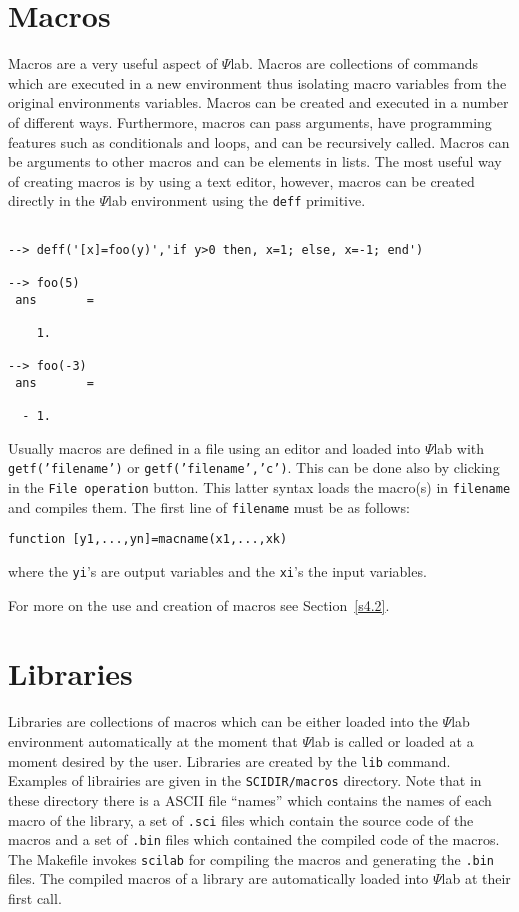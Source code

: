 \section{Macros}
\label{s2.6}

	Macros are a very useful aspect of $\Psi$lab.  Macros
are collections of commands which are executed in a
new environment thus isolating macro variables from the original
environments variables.  Macros
can be created and executed in a number of different ways.
Furthermore, macros can pass arguments, have programming features
such as conditionals and loops, and can be recursively called.
Macros can be arguments
to other macros and can be elements in lists.  The most useful
way of creating macros is by using a text editor, however, macros
can be created directly in the $\Psi$lab environment using the 
{\tt deff} primitive.
\begin{verbatim}
 
--> deff('[x]=foo(y)','if y>0 then, x=1; else, x=-1; end')
 
--> foo(5)
 ans       =
 
    1.  
 
--> foo(-3)
 ans       =
 
  - 1.  
\end{verbatim}
Usually macros are defined in a file using an editor and loaded
into $\Psi$lab with {\tt getf('filename')} or {\tt getf('filename','c')}.
This can be done also by clicking in the {\tt File operation} button.
This latter syntax loads the macro(s) in {\tt filename} and compiles
them.
The first line of {\tt filename} must be as follows:
\begin{verbatim}
function [y1,...,yn]=macname(x1,...,xk)
\end{verbatim}
where the {\tt yi}'s are output variables and the {\tt xi}'s the
input variables.

For more on the use and creation of macros see Section~\ref{s4.2}.

\section{Libraries}
\label{s2.7}

	Libraries are collections of macros which can be either loaded
into the $\Psi$lab environment automatically at the moment that 
$\Psi$lab is called or loaded at a moment desired by the user.  
Libraries are created by the {\tt lib} command. Examples of librairies
are given in the {\tt SCIDIR/macros} directory. Note that in these
directory there is a ASCII file ``names'' which contains the names
of each macro of the library, a set of {\tt .sci} files which
contain the source code of the macros and a set of {\tt .bin} files
which contained the compiled code of the macros. The Makefile invokes
{\tt scilab} for compiling the macros and generating the {\tt .bin}
files. The compiled macros of a library are automatically loaded 
into $\Psi$lab at their first call.

